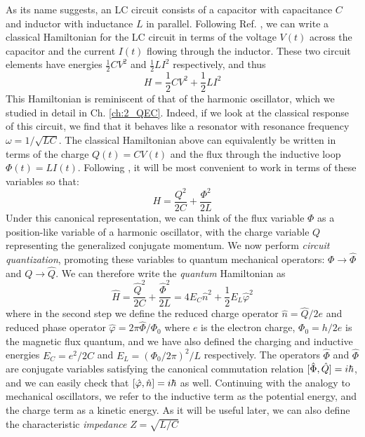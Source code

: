 As its name suggests, an LC circuit consists of a capacitor with capacitance $C$ and inductor with inductance $L$ in parallel. Following Ref. \cite{krantz2019quantum}, we can write a classical Hamiltonian for the LC circuit in terms of the voltage $V(t)$ across the capacitor and the current $I(t)$ flowing through the inductor. These two circuit elements have energies $\frac{1}{2}CV^2$ and $\frac{1}{2}LI^2$ respectively, and thus
\begin{equation}
    H = \frac{1}{2}CV^2 + \frac{1}{2}LI^2
\end{equation}
This Hamiltonian is reminiscent of that of the harmonic oscillator, which we studied in detail in Ch. \ref{ch:2_QEC}. Indeed, if we look at the classical response of this circuit, we find that it behaves like a resonator with resonance frequency $\omega = 1/\sqrt{LC}$. The classical Hamiltonian above can equivalently be written in terms of the charge $Q(t) = CV(t)$ and the flux through the inductive loop $\Phi(t) = LI(t)$. Following \cite{devoret1995quantum}, it will be most convenient to work in terms of these variables so that:
\begin{equation}
    H = \frac{Q^2}{2C} + \frac{\Phi^2}{2L}
\end{equation}
Under this canonical representation, we can think of the flux variable $\Phi$ as a position-like variable of a harmonic oscillator, with the charge variable $Q$ representing the generalized conjugate momentum. We now perform \textit{circuit quantization}, promoting these variables to quantum mechanical operators: $\Phi \to \hat{\Phi}$ and $Q \to \hat{Q}$. We can therefore write the \textit{quantum} Hamiltonian as
\begin{equation}
    \hat{H} = \frac{\hat{Q}^2}{2C} + \frac{\hat{\Phi}^2}{2L} = 4E_C \hat{n}^2 + \frac{1}{2}E_L \hat{\varphi}^2
\end{equation}
where in the second step we define the reduced charge operator $\hat{n} = \hat{Q}/2e$ and reduced phase operator $\hat{\varphi} = 2\pi \hat{\Phi}/\Phi_0$ where $e$ is the electron charge, $\Phi_0 = h/2e$ is the magnetic flux quantum, and we have also defined the charging and inductive energies $E_C = e^2/2C$ and $E_L = (\Phi_0/2\pi)^2/L$ respectively. The operators $\hat{\Phi}$ and $\hat{\Phi}$ are conjugate variables satisfying the canonical commutation relation $[\hat{\Phi}, \hat{Q}] = i\hbar$, and we can easily check that $[\hat{\varphi}, \hat{n}] = i\hbar$ as well. Continuing with the analogy to mechanical oscillators, we refer to the inductive term as the potential energy, and the charge term as a kinetic energy. As it will be useful later, we can also define the characteristic \textit{impedance} $Z = \sqrt{L/C}$

